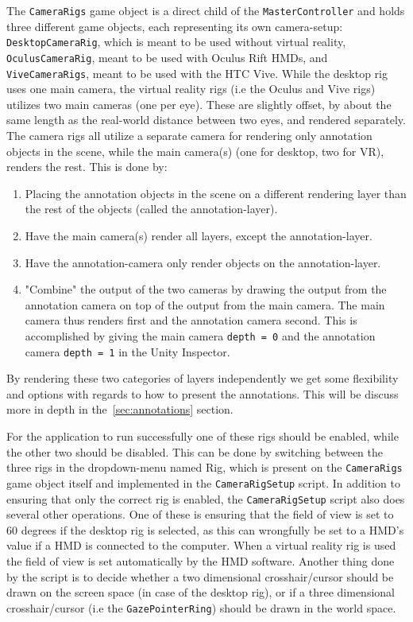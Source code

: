 The \texttt{CameraRigs} game object is a direct child of the \texttt{MasterController} and holds three different game objects, 
each representing its own camera-setup: \texttt{DesktopCameraRig}, which is meant to be used
without virtual reality, \texttt{OculusCameraRig}, meant to be used with Oculus Rift HMDs, and \texttt{ViveCameraRigs}, meant to be used with the HTC Vive. 
While the desktop rig uses one main camera, the virtual reality rigs (i.e the Oculus and Vive rigs) utilizes two main cameras (one per eye).
These are slightly offset, by about the same length as the real-world distance between two eyes, and rendered separately.
The camera rigs all utilize a separate camera for rendering only annotation objects in the scene, while the main camera(s) (one for desktop, two for VR), 
renders the rest. %
This is done by:

\begin{enumerate}
	\item Placing the annotation objects in the scene on a different rendering layer than the rest of the objects (called the annotation-layer).
	\item Have the main camera(s) render all layers, except the annotation-layer.
	\item Have the annotation-camera only render objects on the annotation-layer.
	\item "Combine" the output of the two cameras by drawing the output from the annotation camera on top of the output from the main camera. 
		  The main camera thus renders first and the annotation camera second. This is accomplished by giving the main camera \texttt{depth = 0} and the
		  annotation camera \texttt{depth = 1} in the Unity Inspector. 
\end{enumerate}

By rendering these two categories of layers independently we get some flexibility and options with regards to how to present the annotations.
This will be discuss more in depth in the~\vref{sec:annotations} section.

For the application to run successfully one of these rigs should be enabled, while the other two should be disabled.
This can be done by switching between the three rigs in the dropdown-menu named Rig, which is present on the \texttt{CameraRigs} game object itself and
implemented in the \texttt{CameraRigSetup} script. In addition to ensuring that only the correct rig is enabled, 
the \texttt{CameraRigSetup} script also does several other operations. One of these is ensuring that the field of view is set to 60 degrees if the desktop rig 
is selected, as this can wrongfully be set to a HMD's value if a HMD is connected to the computer. When a virtual reality rig is used the field of view is 
set automatically by the HMD software. Another thing done by the script is to decide whether a two dimensional crosshair/cursor should be drawn on the screen space
(in case of the desktop rig), or if a three dimensional crosshair/cursor (i.e the \texttt{GazePointerRing}) should be drawn in the world space. 
